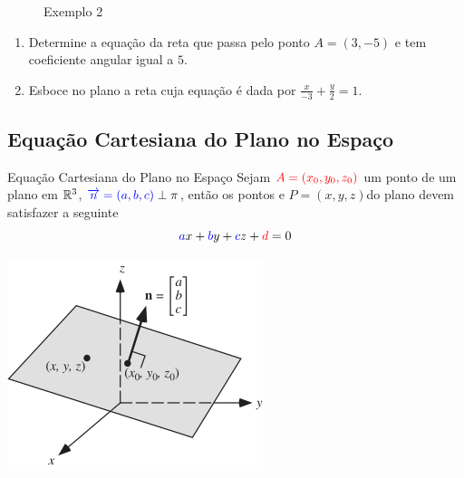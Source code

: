 \begin{frame}
\begin{minipage}{0.45\textwidth}
\begin{figure}[h]
	\caption{Exemplo 2}
\end{figure}
	\end{minipage}


\end{frame}

\begin{frame}[label=retas]
\begin{casa}
	\begin{enumerate}
		\item Determine a equação da reta que passa pelo ponto $A=(3,-5)$ e tem coeficiente angular igual a $5$.
		
		\item Esboce no plano a reta cuja equação é dada por $\frac{x}{-3}+\frac{y}{2}=1$.
	\end{enumerate}
\end{casa}
\end{frame}

\subsection*{Equação Cartesiana do Plano no Espaço}

\begin{frame}[label=planos]{Equação Cartesiana do Plano no Espaço}
Sejam  ${\color{red}A=(x_0,y_0,z_0)}$  um ponto de um plano em $\mathbb{R}^3$, $\textcolor{blue}{\overrightarrow{n}=(a,b,c)}\perp \pi$, então os pontos e  $P=(x,y,z)$do plano devem satisfazer a seguinte 
\[{\color{blue}a}x+{\color{blue}b}y+{\color{blue}c}z+{\color{red}d}=0\]
\begin{center}
\includegraphics[scale=0.8]{figuras/normal-vector.png}
\end{center}
\end{frame}

